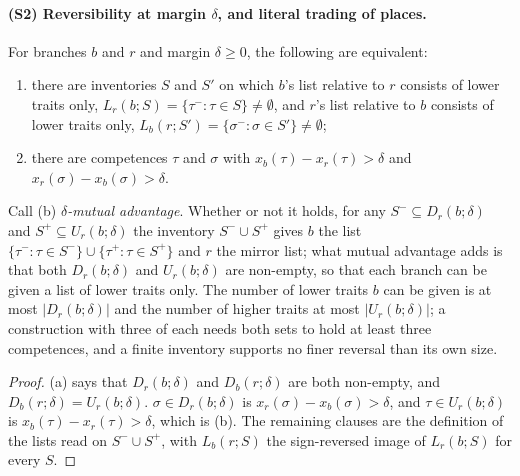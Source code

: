 \paragraph{(S2) Reversibility at margin $\delta$, and literal trading of places.}
\begin{proposition}
\label{prop:reversibility}
For branches $b$ and $r$ and margin $\delta \ge 0$, the following are equivalent:
\begin{enumerate}[label=(\alph*), leftmargin=*, nosep]
\item there are inventories $S$ and $S'$ on which $b$'s list relative to $r$ consists of lower traits only, $L_r(b; S) = \{\tau^{-} : \tau \in S\} \neq \emptyset$, and $r$'s list relative to $b$ consists of lower traits only, $L_b(r; S') = \{\sigma^{-} : \sigma \in S'\} \neq \emptyset$;
\item there are competences $\tau$ and $\sigma$ with $x_b(\tau) - x_r(\tau) > \delta$ and $x_r(\sigma) - x_b(\sigma) > \delta$.
\end{enumerate}
Call (b) \emph{$\delta$-mutual advantage}. Whether or not it holds, for any $S^{-} \subseteq D_r(b;\delta)$ and $S^{+} \subseteq U_r(b;\delta)$ the inventory $S^{-} \cup S^{+}$ gives $b$ the list $\{\tau^{-} : \tau \in S^{-}\} \cup \{\tau^{+} : \tau \in S^{+}\}$ and $r$ the mirror list; what mutual advantage adds is that both $D_r(b;\delta)$ and $U_r(b;\delta)$ are non-empty, so that each branch can be given a list of lower traits only. The number of lower traits $b$ can be given is at most $|D_r(b;\delta)|$ and the number of higher traits at most $|U_r(b;\delta)|$; a construction with three of each needs both sets to hold at least three competences, and a finite inventory supports no finer reversal than its own size.
\end{proposition}
\begin{proof}
(a) says that $D_r(b;\delta)$ and $D_b(r;\delta)$ are both non-empty, and $D_b(r;\delta) = U_r(b;\delta)$. $\sigma \in D_r(b;\delta)$ is $x_r(\sigma) - x_b(\sigma) > \delta$, and $\tau \in U_r(b;\delta)$ is $x_b(\tau) - x_r(\tau) > \delta$, which is (b). The remaining clauses are the definition of the lists read on $S^{-} \cup S^{+}$, with $L_b(r; S)$ the sign-reversed image of $L_r(b; S)$ for every $S$.
\end{proof}

